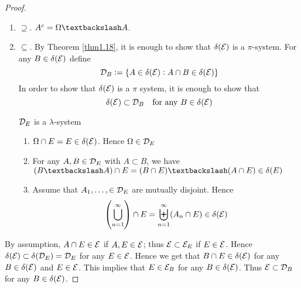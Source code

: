 \documentclass[11pt]{article}
\begin{document}
\begin{proof}
\begin{enumerate}
\item \(\supseteq\). \(A^c=\Omega\textbackslash A\).
\item \(\subseteq\). By Theorem \ref{thm1.18}, it is enough to show that
\(\delta(\mathcal{E})\) is a \(\pi\)-system. For any \(B\in\delta(\mathcal{E})\) define
\begin{equation*}
\mathcal{D}_B:=\{A\in\delta(\mathcal{E}):A\cap B\in\delta(\mathcal{E})\}
\end{equation*}
In order to show that \(\delta(\mathcal{E})\) is a \(\pi\) system, it is enough to
show that 
\begin{equation*}
\delta(\mathcal{E})\subset\mathcal{D}_B\quad\text{for any }B\in\delta(\mathcal{E})
\end{equation*}

\(\mathcal{D}_E\) is a \(\lambda\)-system
\begin{enumerate}
\item \(\Omega\cap E=E\in\delta(\mathcal{E})\). Hence \(\Omega\in\mathcal{D}_E\)
\item For any \(A,B\in\mathcal{D}_E\) with \(A\subset B\), we have 
\((B\textbackslash A)\cap E=(B\cap E)\textbackslash(A\cap E)\in\delta(E)\)
\item Assume that \(A_1,\dots,\in\mathcal{D}_E\) are mutually disjoint. Hence
\begin{equation*}
\left(\displaystyle\bigcup_{n=1}^\infty\right)\cap E=
\biguplus_{n=1}^\infty(A_n\cap E)\in\delta(\mathcal{E})
\end{equation*}
\end{enumerate}
\end{enumerate}


By assumption, \(A\cap E\in\mathcal{E}\) if \(A,E\in\mathcal{E}\); thus
\(\mathcal{E}\subset\mathcal{E}_E\) if \(E\in\mathcal{E}\). Hence
\(\delta(\mathcal{E})\subset\delta(\mathcal{D}_E)=\mathcal{D}_E\) for any \(E\in\mathcal{E}\). Hence we
get that \(B\cap E\in\delta(\mathcal{E})\) for any \(B\in\delta(\mathcal{E})\) and
\(E\in\mathcal{E}\). This implies that \(E\in\mathcal{E}_B\) for any
\(B\in\delta(\mathcal{E})\). Thus \(\mathcal{E}\subset\mathcal{D}_B\) for any
\(B\in\delta(\mathcal{E})\). 
\end{proof}
\end{document}
